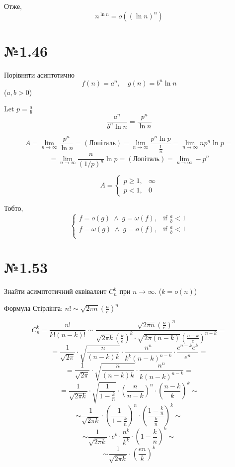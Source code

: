 \documentclass[11pt, a4paper]{article} %
\begin{document}
Отже, $$n^{\ln n} = o((\ln n)^n)$$

\section*{№1.46}
\begin{mdframed}
    Порівняти асиптотично
    $$f(n) = a^n,\quad g(n) = b^n \ln n$$
    ($a,b>0$)
\end{mdframed}

Let $p = \frac{a}{b}$
$$
\frac{a^n}{b^n\ln n} = \frac{p^n}{\ln n}
$$

$$A = \underset{n\to\infty}{\lim}\frac{p^n}{\ln n} = (\text{Лопіталь}) 
= \underset{n\to\infty}{\lim}\frac{p^n \ln p}{\frac{1}{n}} = 
\underset{n\to\infty}{\lim} n p^n \ln p = $$
$$=\underset{n\to\infty}{\lim} \frac{n}{(1/p)^n} \ln p = (\text{Лопіталь}) = \underset{n\to\infty}{\lim} -p^n $$

$$A = \begin{cases}
    p\ge1,& \infty\\
    p<1,& 0
\end{cases}$$

Тобто,
$$\begin{cases}
    f = o(g) \;\wedge\; g=\omega(f),&\text{if } \frac{a}{b}<1\\
    f=\omega(g)\;\wedge\;g = o(f),&\text{if } \frac{a}{b}<1\\
\end{cases}$$

\pagebreak

\section*{№1.53}
\begin{mdframed}
    Знайти асимптотичний еквівалент $C_n^k$ при $n\to\infty$.
    ($k = o(n)$)
\end{mdframed}
Формула Стірлінга: $n! \sim \sqrt{2\pi n}\left(\frac{n}{e}\right)^n$

$$C_n^k = \frac{n!}{k!(n-k)!} \sim 
\frac{\sqrt{2\pi n}\left(\frac{n}{e}\right)^n}{\sqrt{2\pi k}\left(\frac{k}{e}\right)^k \cdot \sqrt{2\pi (n-k)}\left(\frac{n-k}{e}\right)^{n-k}} =
$$
$$
= \frac{1}{\sqrt{2\pi}}\cdot \sqrt{\frac{n}{(n-k)k}} \cdot \frac{n^n}{k^k(n-k)^{n-k}} \cdot \frac{e^{n-k} e^k}{e^n} =
$$
$$
= \frac{1}{\sqrt{2\pi}}\cdot \sqrt{\frac{n}{(n-k)k}} \cdot \frac{n^n}{k(n-k)^{n-k}} =
$$
$$
= \frac{1}{\sqrt{2\pi k}}\cdot \sqrt{\frac{1}{1-\frac{k}{n}}} \cdot \left(\frac{n}{n-k}\right)^n \cdot \left(\frac{n-k}{k}\right)^k \sim
$$
$$
\sim \frac{1}{\sqrt{2\pi k}} \cdot \left(\frac{1}{1-\frac{k}{n}}\right)^n \cdot \left(\frac{1-\frac{k}{n}}{\frac{k}{n}}\right)^k \sim
$$
$$
\sim \frac{1}{\sqrt{2\pi k}} \cdot e^k \cdot \frac{n^{k}}{k^k} \cdot \left(1-\frac{k}{n}\right)^k \sim
$$
$$
\sim \frac{1}{\sqrt{2\pi k}} \cdot \left(\frac{en}{k}\right)^k
$$
\end{document}

